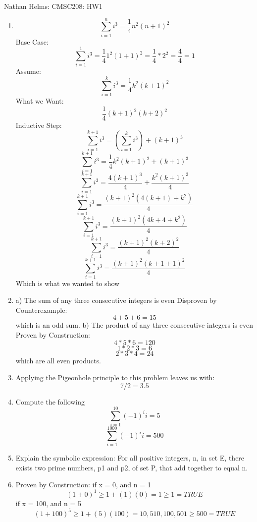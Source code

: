 \documentclass{article}
\begin{document}
Nathan Helms: CMSC208: HW1
\begin{enumerate}
\item
$$\sum_{i=1}^{n} i^3 = \frac{1}{4}n^2\left(n+1\right)^2$$
\newline
Base Case:
$$\sum_{i=1}^{1} i^3 = \frac{1}{4}1^2\left(1+1\right)^2 = \frac{1}{4}*2^2 = \frac{4}{4} = 1$$
Assume:
$$\sum_{i=1}^{k} i^3 = \frac{1}{4}k^2\left(k+1\right)^2$$
What we Want:
$$\frac{1}{4}\left(k+1\right)^2\left(k+2\right)^2$$
Inductive Step:
$$\sum_{i=1}^{k+1} i^3 = \left(\sum_{i=1}^{k} i^3\right)+\left(k+1\right)^3$$
$$\sum_{i=1}^{k+1} i^3 = \frac{1}{4}k^2\left(k+1\right)^2+\left(k+1\right)^3$$
$$\sum_{i=1}^{k+1} i^3 = \frac{4\left(k+1\right)^3}{4}+\frac{k^2\left(k+1\right)^2}{4}$$
$$\sum_{i=1}^{k+1} i^3 = \frac{\left(k+1\right)^2\left(4\left(k+1\right)+k^2\right)}{4}$$
$$\sum_{i=1}^{k+1} i^3 = \frac{\left(k+1\right)^2\left(4k+4+k^2\right)}{4}$$
$$\sum_{i=1}^{k+1} i^3 = \frac{\left(k+1\right)^2\left(k+2\right)^2}{4}$$
$$\sum_{i=1}^{k+1} i^3 = \frac{\left(k+1\right)^2\left(k+1+1\right)^2}{4}$$
Which is what we wanted to show
\item
a) The sum of any three consecutive integers is even\newline
Disproven by Counterexample:\newline
$$4+5+6 = 15$$
which is an odd sum.\newline
b) The product of any three consecutive integers is even\newline
Proven by Construction:\newline
$$4*5*6 = 120$$
$$1*2*3 = 6$$
$$2*3*4 = 24$$
which are all even products.\newline
\item
Applying the Pigeonhole principle to this problem leaves us with:
$$7/2 = 3.5$$
\item
Compute the following
$$\sum_{i=1}^{10} \left(-1\right)^{i}i = 5$$
$$\sum_{i=1}^{1000} \left(-1\right)^{i}i = 500$$
\item
Explain the symbolic expression:\newline
For all positive integers, n, in set E, there exists two prime numbers, p1 and p2, of set P, that add together to equal n.
\item
Proven by Construction:\newline
if x = 0, and n = 1
$$\left(1+0\right)^1\geq1+\left(1\right)\left(0\right) = 1 \geq 1 = TRUE$$
if x = 100, and n = 5
$$\left(1+100\right)^5\geq1+\left(5\right)\left(100\right) = 10,510,100,501 \geq 500 = TRUE$$
\end{enumerate}
\end{document}
